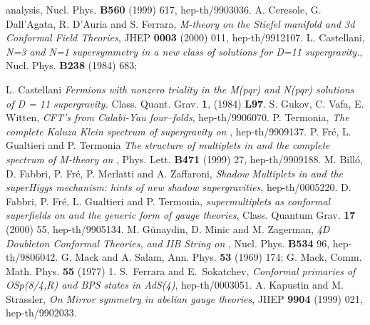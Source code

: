 \documentclass[a4paper,12pt]{article}
\def\n010{N^{0,1,0}}
\begin{document}
\begin{thebibliography}{99}
{ analysis}, Nucl. Phys. {\bf B560} (1999) 617, hep-th/9903036.
 A. Ceresole, G. Dall'Agata, R. D'Auria and S. Ferrara,
{\it M-theory
on the Stiefel manifold and 3d Conformal Field Theories}, JHEP
{\bf 0003} (2000) 011, hep-th/9912107.
 L. Castellani, {\it N=3 and N=1 supersymmetry in a
 new class of solutions for D=11 supergravity.}, Nucl. Phys.
 {\bf B238} (1984) 683;
 \par L. Castellani {\it Fermions with nonzero \coordHE{} triality in the
 M(pqr) and N(pqr) solutions of D = 11 supergravity.} Class. Quant. Grav.
 {\bf 1}, (1984) {\bf L97}.
 S. Gukov, C. Vafa, E. Witten, {\it CFT's from
 Calabi-Yau four--folds}, hep-th/9906070.
 P. Termonia, {\it The complete \coordHE{} Kaluza Klein spectrum
 of \coordHE{} supergravity on \myHighlight{$AdS_4\times \n010$}\coordHE{}}, hep-th/9909137.
 P. Fr\'e, L. Gualtieri and P. Termonia {\it The
 structure of \coordHE{} multiplets in \coordHE{} and the complete
 \coordHE{} spectrum of M-theory on
 \myHighlight{$AdS_4\times \n010$}\coordHE{}}, Phys. Lett. {\bf B471} (1999) 27, hep-th/9909188.
 M. Bill\'o, D. Fabbri, P. Fr\'e, P. Merlatti and A. Zaffaroni,
{\it Shadow Multiplets in \coordHE{} and the superHiggs mechanism:
hints of new shadow supergravities}, hep-th/0005220.
D. Fabbri, P. Fr\'e, L. Gualtieri and P. Termonia,
 {\it {}\coordHE{} supermultiplets as conformal superfields on
 \coordHE{} and the generic form of \coordHE{}
 gauge theories}, Class. Quantum Grav. {\bf 17} (2000) 55, hep-th/9905134.
 M. G\"unaydin, D. Minic and M. Zagerman,
 {\it 4D Doubleton Conformal Theories,} \coordHE{}
 {\it and IIB String on} \coordHE{}, Nucl. Phys. {\bf B534}
 96, hep-th/9806042.
 G. Mack and A. Salam, Ann. Phys. {\bf 53} (1969) 174;
 G. Mack, Comm. Math. Phys. {\bf 55} (1977) 1.
S.~Ferrara and E.~Sokatchev,
{\it Conformal primaries of OSp(8/4,R) and BPS states in AdS(4)}, hep-th/0003051.
 A. Kapustin and M. Strassler, {\it On Mirror symmetry
 in abelian gauge theories}, JHEP {\bf 9904} (1999) 021, hep-th/9902033.
\end{thebibliography}
\end{document}
